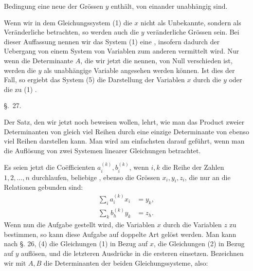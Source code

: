 
Bedingung eine neue der Grössen $y$ enthält, von einander unabhängig sind. 

Wenn wir in dem Gleichungssystem (1) die $x$ nicht als Unbekannte, sondern als Veränderliche betrachten, so werden auch die $y$ veränderliche Grössen sein. Bei dieser Auffassung nennen wir das System (1) eine , insofern dadurch der Uebergang von einem System von Variablen zum anderen vermittelt wird. Nur wenn die Determinante $A$, die wir jetzt die  nennen, von Null verschieden ist, werden die $y$ als unabhängige Variable angesehen werden können. Ist dies der Fall, so ergiebt das System (5) die Darstellung der Variablen $x$ durch die $y$ oder die zu (1) .


\begin{center}
{\large \S.\ 27.}

\vspace{0.5em}
{\large{}}
\end{center}

Der Satz, den wir jetzt noch beweisen wollen, lehrt, wie man das Product zweier Determinanten von gleich viel Reihen durch eine einzige Determinante von ebenso viel Reihen darstellen kann. Man wird am einfachsten darauf geführt, wenn man die Auflösung von zwei Systemen linearer Gleichungen betrachtet.

Es seien jetzt die Coëfficienten $a_i^{(k)}, b_i^{(k)}$, wenn $i,k$ die Reihe der Zahlen $1,2,\ldots,n$ durchlaufen, beliebige , ebenso die Grössen $x_i,y_i,z_i$, die nur an die Relationen gebunden sind:
\begin{align}
 \sum_i a_i^{(k)}x_i&=y_k,\tag{1}\\
 \sum_k b_h^{(k)}y_k&=z_h.\tag{2}
\end{align}
Wenn nun die Aufgabe gestellt wird, die Variablen $x$ durch die Variablen $z$ zu bestimmen, so kann diese Aufgabe auf doppelte Art gelöst werden. Man kann nach §. 26, (4) die Gleichungen (1) in Bezug auf $x$, die Gleichungen (2) in Bezug auf $y$ auflösen, und die letzteren Ausdrücke in die ersteren einsetzen. Bezeichnen wir mit $A,B$ die Determinanten der beiden Gleichungssysteme, also:
